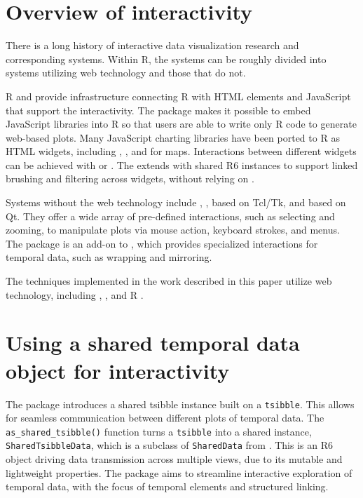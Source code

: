 \hypertarget{overview-of-interactivity}{%
\section{Overview of interactivity}\label{overview-of-interactivity}}

There is a long history of interactive data visualization research and
corresponding systems. Within R, the systems can be roughly divided into
systems utilizing web technology and those that do not.

R  \citep{R-shiny} and 
\citep{R-htmlwidgets} provide infrastructure connecting R with HTML
elements and JavaScript that support the interactivity. The
 package makes it possible to embed JavaScript
libraries into R so that users are able to write only R code to generate
web-based plots. Many JavaScript charting libraries have been ported to
R as HTML widgets, including  \citep{plotly2020},
 \citep{R-rbokeh}, and 
\citep{R-leaflet} for maps. Interactions between different widgets can
be achieved with  or 
\citep{R-crosstalk}. The  extends
 with shared R6 instances to support linked
brushing and filtering across widgets, without relying on
.

Systems without the web technology include ,
 \citep{R-loon}, based on Tcl/Tk, and 
\citep{xie_reactive_2014} based on Qt. They offer a wide array of
pre-defined interactions, such as selecting and zooming, to manipulate
plots via mouse action, keyboard strokes, and menus. The
 package \citep{cheng_enabling_2016} is an add-on to
, which provides specialized interactions for temporal
data, such as wrapping and mirroring.

The techniques implemented in the work described in this paper utilize
web technology, including , , and R
.

\hypertarget{using-a-shared-temporal-data-object-for-interactivity}{%
\section{Using a shared temporal data object for
interactivity}\label{using-a-shared-temporal-data-object-for-interactivity}}

The  package introduces a shared tsibble instance
built on a \texttt{tsibble}. This allows for seamless communication
between different plots of temporal data. The
\texttt{as\_shared\_tsibble()} function turns a \texttt{tsibble} into a
shared instance, \texttt{SharedTsibbleData}, which is a subclass of
\texttt{SharedData} from . This is an R6 object
driving data transmission across multiple views, due to its mutable and
lightweight properties. The  package aims to
streamline interactive exploration of temporal data, with the focus of
temporal elements and structured linking.

